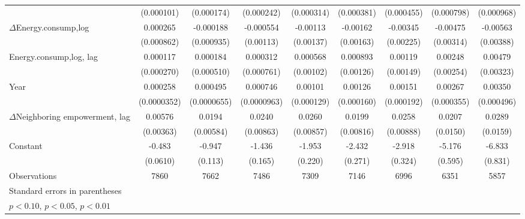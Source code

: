 \begin{table}[htbp]
\begin{tabular}{l*{8}{c}}
                    &  (0.000101)         &  (0.000174)         &  (0.000242)         &  (0.000314)         &  (0.000381)         &  (0.000455)         &  (0.000798)         &  (0.000968)         \\
[1em]
$\Delta$Energy.consump,log             &    0.000265         &   -0.000188         &   -0.000554         &    -0.00113         &    -0.00162         &    -0.00345         &    -0.00475         &    -0.00563         \\
                    &  (0.000862)         &  (0.000935)         &   (0.00113)         &   (0.00137)         &   (0.00163)         &   (0.00225)         &   (0.00314)         &   (0.00388)         \\
[1em]
Energy.consump,log, lag             &    0.000117         &    0.000184         &    0.000312         &    0.000568         &    0.000893         &     0.00119         &     0.00248         &     0.00479         \\
                    &  (0.000270)         &  (0.000510)         &  (0.000761)         &   (0.00102)         &   (0.00126)         &   (0.00149)         &   (0.00254)         &   (0.00323)         \\
[1em]
Year                &    0.000258\sym{***}&    0.000495\sym{***}&    0.000746\sym{***}&     0.00101\sym{***}&     0.00126\sym{***}&     0.00151\sym{***}&     0.00267\sym{***}&     0.00350\sym{***}\\
                    & (0.0000352)         & (0.0000655)         & (0.0000963)         &  (0.000129)         &  (0.000160)         &  (0.000192)         &  (0.000355)         &  (0.000496)         \\
[1em]
$\Delta$Neighboring empowerment, lag&     0.00576         &      0.0194\sym{***}&      0.0240\sym{***}&      0.0260\sym{***}&      0.0199\sym{**} &      0.0258\sym{***}&      0.0207         &      0.0289\sym{*}  \\
                    &   (0.00363)         &   (0.00584)         &   (0.00863)         &   (0.00857)         &   (0.00816)         &   (0.00888)         &    (0.0150)         &    (0.0159)         \\
[1em]
Constant            &      -0.483\sym{***}&      -0.947\sym{***}&      -1.436\sym{***}&      -1.953\sym{***}&      -2.432\sym{***}&      -2.918\sym{***}&      -5.176\sym{***}&      -6.833\sym{***}\\
                    &    (0.0610)         &     (0.113)         &     (0.165)         &     (0.220)         &     (0.271)         &     (0.324)         &     (0.595)         &     (0.831)         \\
\hline
Observations        &        7860         &        7662         &        7486         &        7309         &        7146         &        6996         &        6351         &        5857         \\
\hline\hline
\multicolumn{9}{l}{\footnotesize Standard errors in parentheses}\\
\multicolumn{9}{l}{\footnotesize \sym{*} \(p<0.10\), \sym{**} \(p<0.05\), \sym{***} \(p<0.01\)}\\
\end{tabular}
\end{table}
